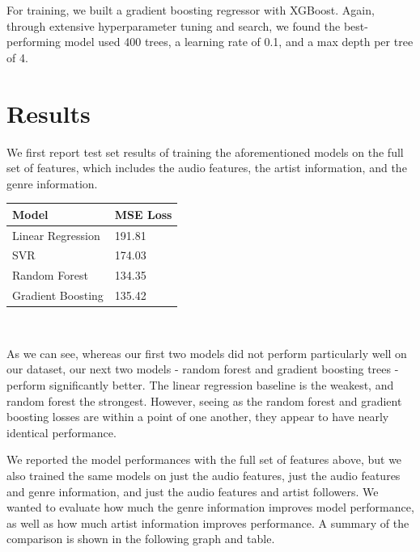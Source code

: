 \documentclass[journal]{IEEEtran}
\begin{document}
For training, we built a gradient boosting regressor with XGBoost. Again, through extensive hyperparameter tuning and search, we found the best-performing model used 400 trees, a learning rate of 0.1, and a max depth per tree of 4. \\

\section{Results}

We first report test set results of training the aforementioned models on the full set of features, which includes the audio features, the artist information, and the genre information. \\

\begin{center}
\begin{tabular}{|l|l|}
\hline
\textbf{Model} & \textbf{MSE Loss} \\ \hline
Linear Regression  & 191.81                 \\ \hline
SVR                & 174.03                 \\ \hline
Random Forest      & 134.35                 \\ \hline
Gradient Boosting  & 135.42                  \\ \hline
\end{tabular} \\
\end{center}

\quad\newline
As we can see, whereas our first two models did not perform particularly well on our dataset, our next two models - random forest and gradient boosting trees - perform significantly better. The linear regression baseline is the weakest, and random forest the strongest. However, seeing as the random forest and gradient boosting losses are within a point of one another, they appear to have nearly identical performance. 

We reported the model performances with the full set of features above, but we also trained the same models on just the audio features, just the audio features and genre information, and just the audio features and artist followers. We wanted to evaluate how much the genre information improves model performance, as well as how much artist information improves performance. A summary of the comparison is shown in the following graph and table.
\end{document}
